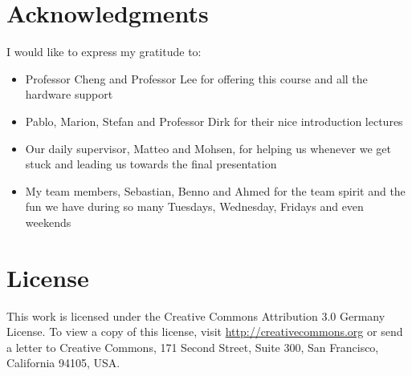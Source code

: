 \documentclass[ICS, PP, english, final]{ICS_thesis}
\begin{document}
\tableofcontents



% 	

\cleardoublepage
\chapter*{Acknowledgments}
I would like to express my gratitude to:

\begin{itemize}
	\item Professor Cheng and Professor Lee for offering this course and all the hardware support
	\item Pablo, Marion, Stefan and Professor Dirk for their nice introduction lectures
	\item Our daily supervisor, Matteo and Mohsen, for helping us whenever we get stuck and leading us towards the final presentation
	\item My team members, Sebastian, Benno and Ahmed for the team spirit and the fun we have during so many Tuesdays, Wednesday, Fridays and even weekends
\end{itemize}

\cleardoublepage
{}
\listoffigures

% 

\cleardoublepage
{}



\cleardoublepage
\chapter*{License}
This work is licensed under the Creative Commons Attribution 3.0 Germany
License. To view a copy of this license,
visit \href{http://creativecommons.org/licenses/by/3.0/de/}{http://creativecommons.org} or send a letter
to Creative Commons, 171 Second Street, Suite 300, San
Francisco, California 94105, USA.
\end{document}

